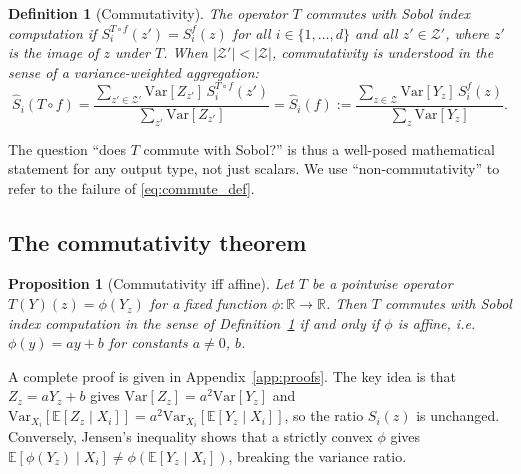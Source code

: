 \documentclass[11pt,onecolumn]{article}
\newtheorem{proposition}{Proposition}
\newtheorem{definition}{Definition}
\begin{document}
\begin{definition}[Commutativity]
\label{def:commute}
The operator $T$ \emph{commutes with Sobol index computation} if
$S_i^{T \circ f}(z') = S_i^f(z)$ for all $i \in \{1,\ldots,d\}$ and all
$z' \in \mathcal{Z}'$, where $z'$ is the image of $z$ under $T$.
When $|\mathcal{Z}'| < |\mathcal{Z}|$, commutativity is understood in the
sense of a variance-weighted aggregation:
\begin{equation}
  \hat{S}_i(T \circ f) = \frac{\sum_{z' \in \mathcal{Z}'} \mathrm{Var}[Z_{z'}]\, S_i^{T\circ f}(z')}
                               {\sum_{z'} \mathrm{Var}[Z_{z'}]}
  = \hat{S}_i(f) := \frac{\sum_{z \in \mathcal{Z}} \mathrm{Var}[Y_z]\, S_i^f(z)}
                         {\sum_z \mathrm{Var}[Y_z]}.
  \label{eq:commute_def}
\end{equation}
\end{definition}

The question ``does $T$ commute with Sobol?'' is thus a well-posed mathematical
statement for any output type, not just scalars.
We use ``non-commutativity'' to refer to the failure of \eqref{eq:commute_def}.

\subsection{The commutativity theorem}
\label{sec:commute_thm}

\begin{proposition}[Commutativity iff affine]
\label{prop:main}
Let $T$ be a pointwise operator $T(Y)(z) = \phi(Y_z)$ for a fixed function
$\phi: \mathbb{R} \to \mathbb{R}$.  Then $T$ commutes with Sobol index
computation in the sense of Definition~\ref{def:commute} if and only if
$\phi$ is affine, i.e.\ $\phi(y) = ay + b$ for constants $a \neq 0$, $b$.
\end{proposition}

A complete proof is given in Appendix~\ref{app:proofs}.  The key idea is that
$Z_z = aY_z + b$ gives $\mathrm{Var}[Z_z] = a^2 \mathrm{Var}[Y_z]$ and
$\mathrm{Var}_{X_i}[\mathbb{E}[Z_z \mid X_i]] = a^2 \mathrm{Var}_{X_i}[\mathbb{E}[Y_z \mid X_i]]$,
so the ratio $S_i(z)$ is unchanged.  Conversely, Jensen's inequality shows
that a strictly convex $\phi$ gives $\mathbb{E}[\phi(Y_z) \mid X_i] \neq \phi(\mathbb{E}[Y_z \mid X_i])$,
breaking the variance ratio.
\end{document}
